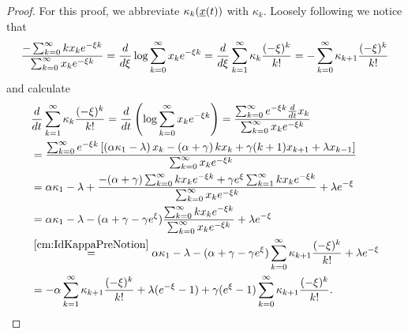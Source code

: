 \begin{proof}
For this proof, we abbreviate $\kappa_k( \underline{x} \! \left( t \right) )$ with $\kappa_k$. Loosely following
\cite{depperschmidt_mathematical_2011} we notice that
\begin{align} \label{cm:IdKappaPreNotion}
\frac{ -\sum_{k=0}^\infty k  x_{k}  e^{-\xi k} }
{ \sum_{k=0}^\infty  x_{k}  e^{-\xi k} }
= \frac{d}{d \xi} \log \sum_{k=0}^\infty  x_{k}  e^{-\xi k}
= \frac{d}{d \xi} \sum_{k=1}^\infty \kappa_k \frac{(-\xi)^k}{k!}
= - \sum_{k=0}^\infty \kappa_{k+1} \frac{(-\xi)^k}{k!}
\end{align}
and calculate
\begin{align} \nonumber
&  \frac{d}{d t} \sum_{k=1}^\infty \kappa_k \frac{(-\xi)^k}{k!}
= \frac{d}{d t} \left( \log \sum_{k=0}^\infty  x_{k}  e^{-\xi k} \right)
=  \frac{ \sum_{k=0}^\infty e^{-\xi k} \frac{d}{d t} { x_{k} }}
{\sum_{k=0}^\infty  x_{k}  e^{-\xi k}} \\ \nonumber
& =  \frac{
\sum_{k=0}^\infty e^{-\xi k}
\left[
\left( \alpha \kappa_1 - \lambda \right)  x_{k} 
- \left(\alpha + \gamma \right) k  x_{k} 
+ \gamma (k+1)  x_{k+1} 
+ \lambda  x_{k-1} 
\right]
}
{\sum_{k=0}^\infty  x_{k}  e^{-\xi k}} \\ \nonumber
& = \alpha \kappa_1 - \lambda +
\frac{
-(\alpha+\gamma) \sum_{k=0}^\infty k  x_{k}  e^{-\xi k}
+ \gamma e^\xi \sum_{k=1}^\infty k  x_{k}  e^{-\xi k}
}
{\sum_{k=0}^\infty  x_{k}  e^{-\xi k}}
+ \lambda e^{-\xi} \\ \nonumber
& = \alpha \kappa_1 - \lambda -(\alpha+\gamma - \gamma e^\xi )
\frac{
\sum_{k=0}^\infty k  x_{k}  e^{-\xi k}
}{
\sum_{k=0}^\infty  x_{k}  e^{-\xi k}
}
+ \lambda e^{-\xi} \\ \nonumber
&\stackrel{\ref{cm:IdKappaPreNotion}}{=} \alpha \kappa_1 - \lambda -(\alpha+\gamma -
\gamma e^\xi )
\sum_{k=0}^\infty \kappa_{k+1}
\frac{ (-\xi)^k }{ k! }
+ \lambda e^{-\xi} \\ \label{cm:IdKappaCalc}
&=  -\alpha \sum_{k=1}^\infty \kappa_{k+1} \frac{ (-\xi)^k }{ k! }
+ \lambda (e^{- \xi} - 1)
+ \gamma (e^{\xi} - 1) \sum_{k=0}^\infty \kappa_{k+1} \frac{ (-\xi)^k }{ k! }.
\end{align}


\end{proof}
